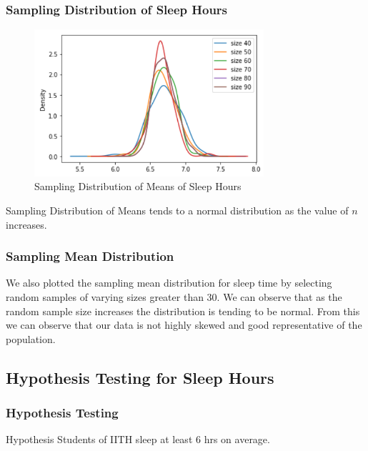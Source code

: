 \documentclass[11pt,]{beamer}
\begin{document}
\begin{frame}

	\frametitle{Sampling Distribution of Sleep Hours}
	
	\begin{figure}
		\includegraphics[width=8.5cm]{Normal_Dist.png}
		\caption{Sampling Distribution of Means of Sleep Hours}
	\end{figure}
	
	Sampling Distribution of Means tends to a normal distribution as the value of $n$ increases.
	
\end{frame}

\begin{frame}
    
    \frametitle{Sampling Mean Distribution}
    
    We also plotted the sampling mean distribution for sleep time by selecting random samples of varying sizes greater than 30. We can observe that as the random sample size increases the distribution is tending to be normal. From this we can observe that our data is not highly skewed and good representative of the population.

\end{frame}

\subsection{Hypothesis Testing for Sleep Hours}

\begin{frame}

    \frametitle{Hypothesis Testing}
    
    \begin{block}{Hypothesis}
        Students of IITH  sleep at least $6$ hrs on average. 
    \end{block}
    
\end{frame}
\end{document}
